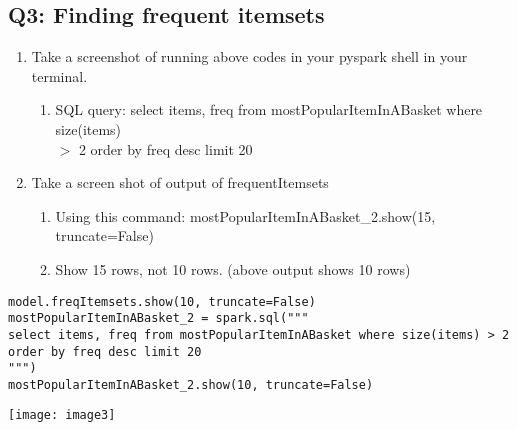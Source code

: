 \documentclass[]{article}
\begin{document}
\subsection*{Q3: Finding frequent itemsets}
\begin{enumerate}[before=\itshape,label=\arabic*.]
	\item Take a screenshot of running above codes in your pyspark shell in your terminal.
	\begin{enumerate}[before=\itshape,label=\alph*.]
		\item SQL query: select items, freq from mostPopularItemInABasket where size(items) \\ $>$ 2 order by freq desc limit 20
	\end{enumerate}
	\item Take a screen shot of output of frequentItemsets
	\begin{enumerate}[before=\itshape,label=\alph*.]
		\item Using this command: mostPopularItemInABasket\_2.show(15, truncate=False)
		\item Show 15 rows, not 10 rows. (above output shows 10 rows)
	\end{enumerate}
\end{enumerate} 

\begin{verbatim}
model.freqItemsets.show(10, truncate=False)
mostPopularItemInABasket_2 = spark.sql("""
select items, freq from mostPopularItemInABasket where size(items) > 2 order by freq desc limit 20
""")
mostPopularItemInABasket_2.show(10, truncate=False)
\end{verbatim}
\texttt{[image: image3]}
\end{document}
